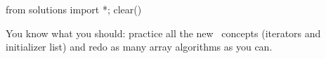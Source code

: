 \begin{python0}
from solutions import *; clear()
\end{python0}

You know what you should:
practice all the new \cpp\ concepts (iterators and initializer list)
and redo as many array algorithms as you can.


















